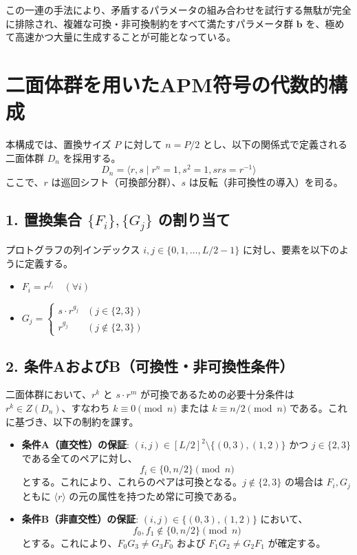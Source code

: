 \documentclass[a4paper,11pt,dvipdfmx]{jsarticle}
\theoremstyle{definition}
\begin{document}
この一連の手法により、矛盾するパラメータの組み合わせを試行する無駄が完全に排除され、複雑な可換・非可換制約をすべて満たすパラメータ群 $\boldsymbol{b}$ を、極めて高速かつ大量に生成することが可能となっている。

\section{二面体群を用いたAPM符号の代数的構成}

本構成では、置換サイズ $P$ に対して $n = P/2$ とし、以下の関係式で定義される二面体群 $D_n$ を採用する。
\begin{equation}
    D_n = \langle r, s \mid r^n = 1, s^2 = 1, srs = r^{-1} \rangle
\end{equation}
ここで、$r$ は巡回シフト（可換部分群）、$s$ は反転（非可換性の導入）を司る。

\subsection{1. 置換集合 $\{F_i\}, \{G_j\}$ の割り当て}
プロトグラフの列インデックス $i, j \in \{0, 1, \dots, L/2-1\}$ に対し、要素を以下のように定義する。
\begin{itemize}
    \item $F_i = r^{f_i} \quad (\forall i)$
    \item $G_j = 
    \begin{cases} 
    s \cdot r^{g_j} & (j \in \{2, 3\}) \\
    r^{g_j} & (j \notin \{2, 3\})
    \end{cases}$
\end{itemize}

\subsection{2. 条件AおよびB（可換性・非可換性条件）}
二面体群において、$r^k$ と $s \cdot r^m$ が可換であるための必要十分条件は $r^k \in Z(D_n)$、すなわち $k \equiv 0 \pmod n$ または $k \equiv n/2 \pmod n$ である。これに基づき、以下の制約を課す。

\begin{itemize}
    \item \textbf{条件A（直交性）の保証}: 
    $(i, j) \in [L/2]^2 \setminus \{(0, 3), (1, 2)\}$ かつ $j \in \{2, 3\}$ である全てのペアに対し、
    \begin{equation}
        f_i \in \{0, n/2\} \pmod n
    \end{equation}
    とする。これにより、これらのペアは可換となる。$j \notin \{2, 3\}$ の場合は $F_i, G_j$ ともに $\langle r \rangle$ の元の属性を持つため常に可換である。
    
    \item \textbf{条件B（非直交性）の保証}: 
    $(i, j) \in \{(0, 3), (1, 2)\}$ において、
    \begin{equation}
        f_0, f_1 \notin \{0, n/2\} \pmod n
    \end{equation}
    とする。これにより、$F_0 G_3 \neq G_3 F_0$ および $F_1 G_2 \neq G_2 F_1$ が確定する。
\end{itemize}
\end{document}
